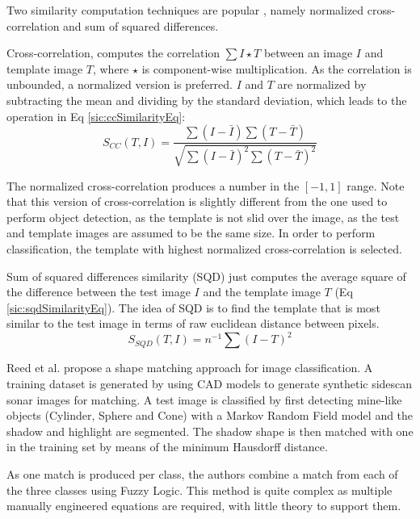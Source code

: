 Two similarity computation techniques are popular \cite{gonzalezDIP2006}, namely normalized cross-correlation and sum of squared differences.

Cross-correlation, computes the correlation $\sum I \star T$ between an image $I$ and template image $T$, where $\star$ is component-wise multiplication. As the correlation is unbounded, a normalized version is preferred. $I$ and $T$ are normalized by subtracting the mean and dividing by the standard deviation, which leads to the operation in Eq \ref{sic:ccSimilarityEq}:
\vspace*{1em}
\begin{equation}
	S_{CC}(T, I) = \frac{\sum (I - \bar{I}) \sum (T - \bar{T})}{\sqrt{\sum (I - \bar{I})^2 \sum (T - \bar{T})^2}}
	\label{sic:ccSimilarityEq}
\end{equation}

The normalized cross-correlation produces a number in the $[-1, 1]$ range. Note that this version of cross-correlation is slightly different from the one used to perform object detection, as the template is not slid over the image, as the test and template images are assumed to be the same size. In order to perform classification, the template with highest normalized cross-correlation is selected.

Sum of squared differences similarity (SQD) just computes the average square of the difference between the test image $I$ and the template image $T$ (Eq \ref{sic:sqdSimilarityEq}). The idea of SQD is to find the template that is most similar to the test image in terms of raw euclidean distance between pixels.
\vspace*{1em}
\begin{equation}
	S_{SQD}(T, I) = n^{-1} \sum (I - T)^2
	\label{sic:sqdSimilarityEq}
\end{equation}

Reed et al. \cite{reed2004automated} propose a shape matching approach for image classification. A training dataset is generated by using CAD models to generate synthetic sidescan sonar images for matching. A test image is classified by first detecting mine-like objects (Cylinder, Sphere and Cone) with a Markov Random Field model and the shadow and highlight are segmented. The shadow shape is then matched with one in the training set by means of the minimum Hausdorff distance.

As one match is produced per class, the authors combine a match from each of the three classes using Fuzzy Logic. This method is quite complex as multiple manually engineered equations are required, with little theory to support them.


